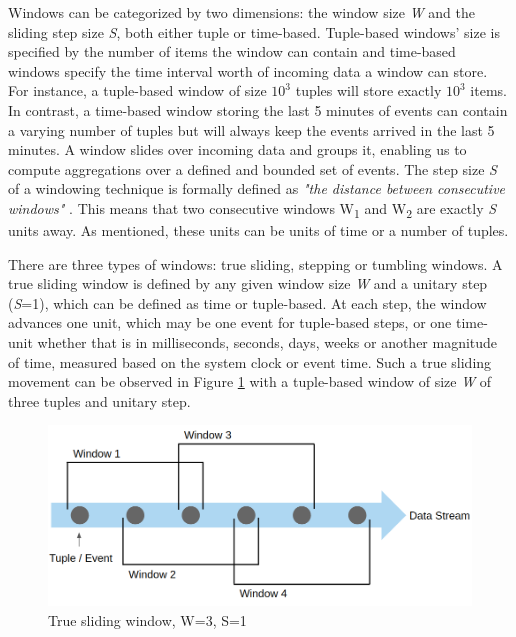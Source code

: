 Windows can be categorized by two dimensions: the window size \textit{W} and the sliding step size \textit{S}, both either tuple or time-based. Tuple-based windows' size is specified by the number of items the window can contain and time-based windows specify the time interval worth of incoming data a window can store. For instance, a tuple-based window of size $10^3$ tuples will store exactly $10^3$ items. In contrast, a time-based window storing the last 5 minutes of events can contain a varying number of tuples but will always keep the events arrived in the last 5 minutes. A window slides over incoming data and groups it, enabling us to compute aggregations over a defined and bounded set of events. The step size \textit{S} of a windowing technique is formally defined as \textit{"the distance between consecutive windows"} \cite{Botan-SECRET}. This means that two consecutive windows W\textsubscript{1} and W\textsubscript{2} are exactly \textit{S} units away. As mentioned, these units can be units of time or a number of tuples.

There are three types of windows: true sliding, stepping or tumbling windows.
A true sliding window is defined by any given window size \textit{W} and a unitary step (\textit{S}=1), which can be defined as time or tuple-based. At each step, the window advances one unit, which may be one event for tuple-based steps, or one time-unit whether that is in milliseconds, seconds, days, weeks or another magnitude of time, measured based on the system clock or event time. Such a true sliding movement can be observed in Figure \ref{fig:sliding-window} with a tuple-based window of size \textit{W} of three tuples and unitary step. 

\begin{figure}[!htb]
    \begin{center}
      \hspace*{0.6in}
      \includegraphics[scale=0.35]{figures/sliding.png}
      \caption[True sliding window]{True sliding window, W=3, S=1}
      \label{fig:sliding-window} 
    \end{center}
\end{figure} 

